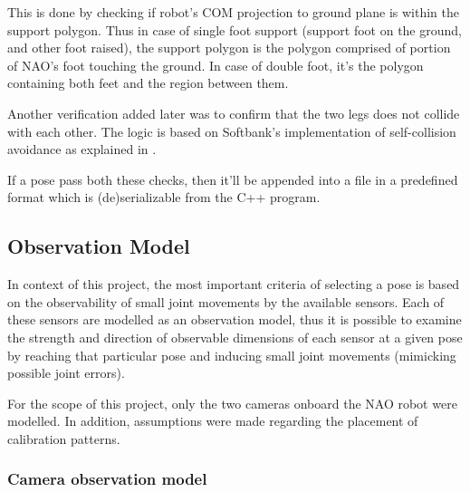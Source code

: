 \documentclass[english, printversion, nomenclature, notitle]{tuvisionthesis} %
\begin{document}
This is done by checking if robot's COM projection to ground plane is within the support polygon. Thus in case of single foot support (support foot on the ground, and other foot raised), the support polygon is the polygon comprised of portion of NAO's foot touching the ground. In case of double foot, it's the polygon containing both feet and the region between them. 

Another verification added later was to confirm that the two legs does not collide with each other. The logic is based on Softbank's implementation of self-collision avoidance as explained in .

If a pose pass both these checks, then it'll be appended into a file in a predefined format which is (de)serializable from the C++ program. 

\subsection{Observation Model}
In context of this project, the most important criteria of selecting a pose is based on the observability of small joint movements by the available sensors. Each of these sensors are modelled as an observation model, thus it is possible to examine the strength and direction of observable dimensions of each sensor at a given pose by reaching that particular pose and inducing small joint movements (mimicking possible joint errors).

For the scope of this project, only the two cameras onboard the NAO robot were modelled. In addition, assumptions were made regarding the placement of calibration patterns.

\subsubsection{Camera observation model}
\end{document}
